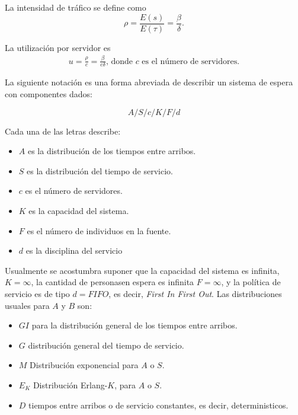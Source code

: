 \documentclass{article}
\numberwithin{equation}{section}
\begin{document}
La intensidad de tr\'afico se define como
\begin{equation}
\rho=\frac{E\left(s\right)}{E\left(\tau\right)}=\frac{\beta}{\delta}.
\end{equation}

La utilizaci\'on por servidor es
\begin{eqnarray}
u=\frac{\rho}{c}=\frac{\beta}{c\delta}\textrm{, donde }c\textrm{ es el n\'umero de servidores.}
\end{eqnarray}


La siguiente notaci\'on es una forma abreviada de describir un sistema de espera con componentes dados:

\begin{equation}\label{Notacion.K.L.}
A/S/c/K/F/d
\end{equation}

Cada una de las letras describe:

\begin{itemize}
\item $A$ es la distribuci\'on de los tiempos entre arribos.
\item $S$ es la distribuci\'on del tiempo de servicio.
\item $c$ es el n\'umero de servidores.
\item $K$ es la capacidad del sistema.
\item $F$ es el n\'umero de individuos en la fuente.
\item $d$ es la disciplina del servicio
\end{itemize}

Usualmente se acostumbra suponer que la capacidad del sistema es infinita, $K=\infty$, la cantidad de personasen espera es infinita $F=\infty$, y la pol\'itica de servicio es de tipo $d=FIFO$, es decir, \textit{First In First Out}. Las distribuciones usuales para $A$ y $B$ son:

\begin{itemize}
\item $GI$ para la distribuci\'on general de los tiempos entre arribos.
\item $G$ distribuci\'on general del tiempo de servicio.
\item $M$ Distribuci\'on exponencial para $A$ o $S$.
\item $E_{K}$ Distribuci\'on Erlang-$K$, para $A$ o $S$.
\item $D$ tiempos entre arribos o de servicio constantes, es decir, deterministicos.
\end{itemize}
\end{document}
